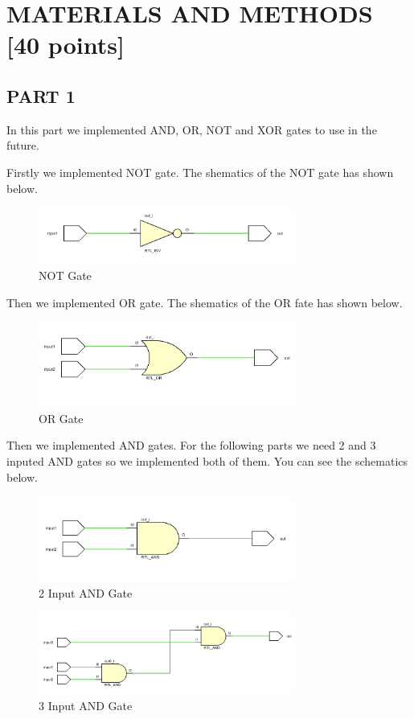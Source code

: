 \documentclass[pdftex,12pt,a4paper]{article}
\begin{document}
\section{MATERIALS AND METHODS [40 points]}

\subsection{PART 1}
In this part we implemented AND, OR, NOT and XOR gates to use in the future.

Firstly we implemented NOT gate. The shematics of the NOT gate has shown below.

\begin{figure}[H]
	\centering
	\includegraphics[width=0.75\textwidth]{not_gate_vivado.png}	
	\caption{NOT Gate}
	
\end{figure}

Then we implemented OR gate. The shematics of the OR fate has shown below.

\begin{figure}[H]
    \centering
    \includegraphics[width=0.75\textwidth]{or_gate_vivado.png}
    \caption{OR Gate}
\end{figure}

Then we implemented AND gates. For the following parts we need 2 and 3 inputed AND gates so we implemented both of them. You can see the schematics below.

\begin{figure}[H]
    \centering
    \includegraphics[width=0.75\textwidth]{andgate_viado.png}
    \caption{2 Input AND Gate}
\end{figure}
\begin{figure}[H]
    \centering
    \includegraphics[width=0.75\textwidth]{andgate3input_vivado.png}
    \caption{3 Input AND Gate}
\end{figure}
\end{document}
